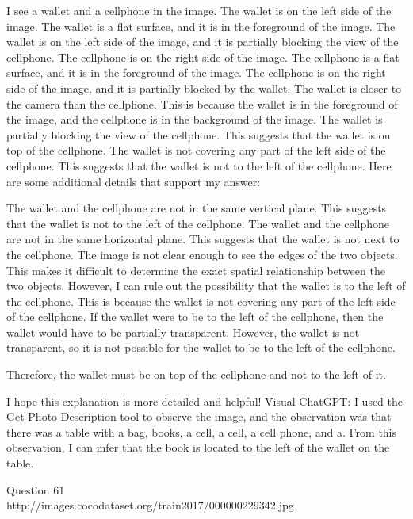 \begin{enumerate}
    I see a wallet and a cellphone in the image.
    The wallet is on the left side of the image. The wallet is a flat surface, and it is in the foreground of the image. The wallet is on the left side of the image, and it is partially blocking the view of the cellphone.
    The cellphone is on the right side of the image. The cellphone is a flat surface, and it is in the foreground of the image. The cellphone is on the right side of the image, and it is partially blocked by the wallet.
    The wallet is closer to the camera than the cellphone. This is because the wallet is in the foreground of the image, and the cellphone is in the background of the image.
    The wallet is partially blocking the view of the cellphone. This suggests that the wallet is on top of the cellphone.
    The wallet is not covering any part of the left side of the cellphone. This suggests that the wallet is not to the left of the cellphone.
    Here are some additional details that support my answer:
    
    The wallet and the cellphone are not in the same vertical plane. This suggests that the wallet is not to the left of the cellphone.
    The wallet and the cellphone are not in the same horizontal plane. This suggests that the wallet is not next to the cellphone.
    The image is not clear enough to see the edges of the two objects. This makes it difficult to determine the exact spatial relationship between the two objects.
    However, I can rule out the possibility that the wallet is to the left of the cellphone. This is because the wallet is not covering any part of the left side of the cellphone. If the wallet were to be to the left of the cellphone, then the wallet would have to be partially transparent. However, the wallet is not transparent, so it is not possible for the wallet to be to the left of the cellphone.
    
    Therefore, the wallet must be on top of the cellphone and not to the left of it.
    
    I hope this explanation is more detailed and helpful!
    \subitem Visual ChatGPT: I used the Get Photo Description tool to observe the image, and the observation was that there was a table with a bag, books, a cell, a cell, a cell phone, and a. From this observation, I can infer that the book is located to the left of the wallet on the table.
\end{enumerate}
Question 61\\
http://images.cocodataset.org/train2017/000000229342.jpg
